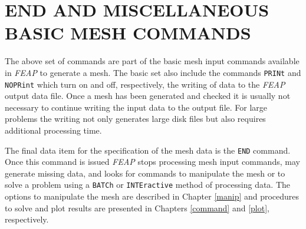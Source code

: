 \chapter[End and Miscellaneous Commands]
{END AND MISCELLANEOUS BASIC MESH COMMANDS}
\label{end}

The above set of commands are part of the basic mesh input commands
available in {\sl FEAP} to generate a mesh.  The basic set
also include the commands {\tt PRINt} and {\tt NOPRint} which turn on
and off, respectively, the writing of data to the {\sl FEAP} output data file.
Once a mesh has been generated and checked it is usually not necessary to
continue writing the input data to the output file.  For large problems
the writing not only generates large disk files but also requires
additional processing time.

The final data item for the specification of the mesh data is the {\tt END}
command.  Once this command is issued {\sl FEAP} stops processing mesh
input commands, may generate missing data,
and looks for commands to manipulate the mesh or to solve
a problem using a {\tt BATCh} or {\tt INTEractive} method of processing
data.  The options to manipulate the mesh are described in Chapter \ref{manip}
and procedures to solve and plot results are presented
in Chapters \ref{command} and \ref{plot}, respectively.
